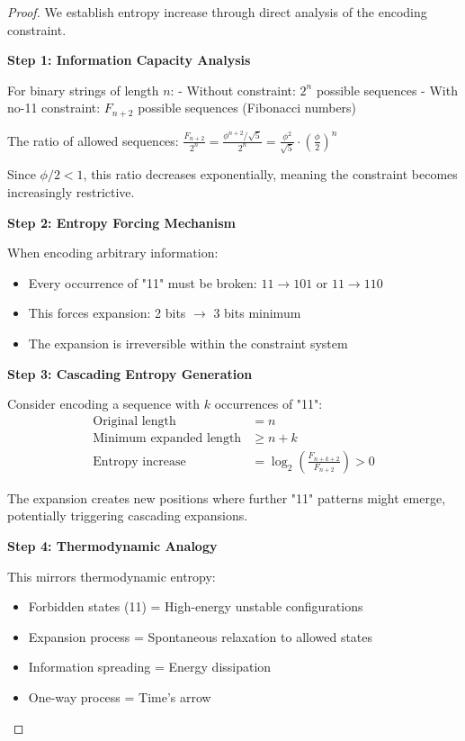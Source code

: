 \documentclass[12pt,letterpaper]{article}
\begin{document}
\begin{proof}
We establish entropy increase through direct analysis of the encoding constraint.

\textbf{Step 1: Information Capacity Analysis}

For binary strings of length $n$:
- Without constraint: $2^n$ possible sequences
- With no-11 constraint: $F_{n+2}$ possible sequences (Fibonacci numbers)

The ratio of allowed sequences: $\frac{F_{n+2}}{2^n} = \frac{\phi^{n+2}/\sqrt{5}}{2^n} = \frac{\phi^2}{\sqrt{5}} \cdot \left(\frac{\phi}{2}\right)^n$

Since $\phi/2 < 1$, this ratio decreases exponentially, meaning the constraint becomes increasingly restrictive.

\textbf{Step 2: Entropy Forcing Mechanism}

When encoding arbitrary information:
\begin{itemize}
\item Every occurrence of "11" must be broken: $11 \to 101$ or $11 \to 110$
\item This forces expansion: 2 bits $\to$ 3 bits minimum
\item The expansion is irreversible within the constraint system
\end{itemize}

\textbf{Step 3: Cascading Entropy Generation}

Consider encoding a sequence with $k$ occurrences of "11":
\begin{align}
\text{Original length} &= n \\
\text{Minimum expanded length} &\geq n + k \\
\text{Entropy increase} &= \log_2\left(\frac{F_{n+k+2}}{F_{n+2}}\right) > 0
\end{align}

The expansion creates new positions where further "11" patterns might emerge, potentially triggering cascading expansions.

\textbf{Step 4: Thermodynamic Analogy}

This mirrors thermodynamic entropy:
\begin{itemize}
\item Forbidden states (11) = High-energy unstable configurations
\item Expansion process = Spontaneous relaxation to allowed states
\item Information spreading = Energy dissipation
\item One-way process = Time's arrow
\end{itemize}


\end{proof}
\end{document}
